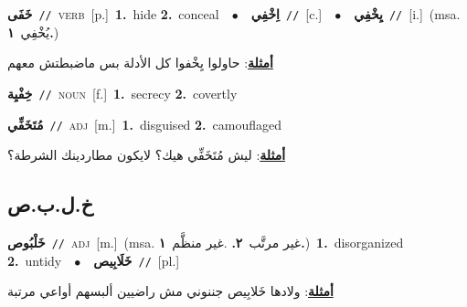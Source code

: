 \documentclass[10pt,a4paper,twoside]{article} %
\begin{document}
\begin{multicols}{2}
{\setlength\topsep{0pt}\textbf{\foreignlanguage{arabic}{خَفَى}}\ {\color{gray}\texttt{//}\color{black}}\ \textsc{verb}\ [p.]\ \textbf{1.}~hide  \textbf{2.}~conceal\ \ $\bullet$\ \ \setlength\topsep{0pt}\textbf{\foreignlanguage{arabic}{اِخْفِي}}\ {\color{gray}\texttt{//}\color{black}}\ [c.]\ \ $\bullet$\ \ \setlength\topsep{0pt}\textbf{\foreignlanguage{arabic}{يِخْفِي}}\ {\color{gray}\texttt{//}\color{black}}\ [i.]\ \color{gray}(msa. \foreignlanguage{arabic}{يُخْفِي}~\foreignlanguage{arabic}{\textbf{١.}})\color{black}\  \begin{flushright}\color{gray}\foreignlanguage{arabic}{\textbf{\underline{\foreignlanguage{arabic}{أمثلة}}}: حاولوا يِخْفوا كل الأدلة بس ماضبطتش معهم}\end{flushright}\color{black}} \vspace{2mm}

{\setlength\topsep{0pt}\textbf{\foreignlanguage{arabic}{خِفْيِة}}\ {\color{gray}\texttt{//}\color{black}}\ \textsc{noun}\ [f.]\ \textbf{1.}~secrecy  \textbf{2.}~covertly\ } \vspace{2mm}

{\setlength\topsep{0pt}\textbf{\foreignlanguage{arabic}{مُتَخَفِّي}}\ {\color{gray}\texttt{//}\color{black}}\ \textsc{adj}\ [m.]\ \textbf{1.}~disguised  \textbf{2.}~camouflaged\  \begin{flushright}\color{gray}\foreignlanguage{arabic}{\textbf{\underline{\foreignlanguage{arabic}{أمثلة}}}: ليش مُتَخَفِّي هيك؟ لايكون مطاردينك الشرطة؟}\end{flushright}\color{black}} \vspace{2mm}

\vspace{-3mm}
\subsection*{\color{blue}\foreignlanguage{arabic}{خ.ل.ب.ص}\color{blue}{}} 

{\setlength\topsep{0pt}\textbf{\foreignlanguage{arabic}{خَلْبُوص}}\ {\color{gray}\texttt{//}\color{black}}\ \textsc{adj}\ [m.]\ \color{gray}(msa. \foreignlanguage{arabic}{غير مرتَّب}~\foreignlanguage{arabic}{\textbf{٢.}}  .\foreignlanguage{arabic}{غير منظَّم}~\foreignlanguage{arabic}{\textbf{١.}})\color{black}\ \textbf{1.}~disorganized  \textbf{2.}~untidy\ \ $\bullet$\ \ \setlength\topsep{0pt}\textbf{\foreignlanguage{arabic}{خَلَابِيص}}\ {\color{gray}\texttt{//}\color{black}}\ [pl.]\  \begin{flushright}\color{gray}\foreignlanguage{arabic}{\textbf{\underline{\foreignlanguage{arabic}{أمثلة}}}: ولادها خَلابِيص جننوني مش راضيين ألبسهم أواعي مرتبة}\end{flushright}\color{black}} \vspace{2mm}


\end{multicols}
\end{document}
